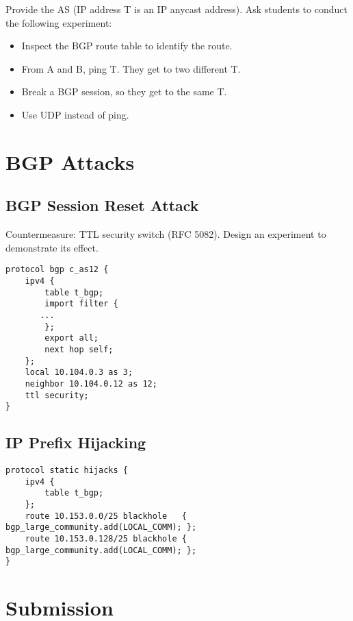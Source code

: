 Provide the AS (IP address T is an IP anycast address). 
Ask students to conduct the following experiment:

\begin{itemize}
  \item Inspect the BGP route table to identify the route.
  \item From A and B, ping T. They get to two different T.
  \item Break a BGP session, so they get to the same T.
  \item Use UDP instead of ping.
\end{itemize}
 


\section{BGP Attacks} 


\subsection{BGP Session Reset Attack} 



Countermeasure: TTL security switch (RFC 5082).
Design an experiment to demonstrate its effect.

\begin{lstlisting}
protocol bgp c_as12 {
    ipv4 {
        table t_bgp;
        import filter {
	   ...
        };
        export all;
        next hop self;
    };
    local 10.104.0.3 as 3;
    neighbor 10.104.0.12 as 12;
    ttl security;
}
\end{lstlisting}
 

\subsection{IP Prefix Hijacking} 



\begin{lstlisting}
protocol static hijacks {
    ipv4 {
        table t_bgp;
    };
    route 10.153.0.0/25 blackhole   { bgp_large_community.add(LOCAL_COMM); };
    route 10.153.0.128/25 blackhole { bgp_large_community.add(LOCAL_COMM); };
}
\end{lstlisting}
 


\section{Submission}








